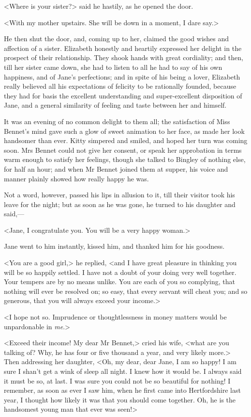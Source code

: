 <Where is your sister?> said he hastily, as he opened the door.

<With my mother upstairs. She will be down in a moment, I dare say.>

He then shut the door, and, coming up to her, claimed the good wishes and affection of a sister. Elizabeth honestly and heartily expressed her delight in the prospect of their relationship. They shook hands with great cordiality; and then, till her sister came down, she had to listen to all he had to say of his own happiness, and of Jane's perfections; and in spite of his being a lover, Elizabeth really believed all his expectations of felicity to be rationally founded, because they had for basis the excellent understanding and super-excellent disposition of Jane, and a general similarity of feeling and taste between her and himself.

It was an evening of no common delight to them all; the satisfaction of Miss Bennet's mind gave such a glow of sweet animation to her face, as made her look handsomer than ever. Kitty simpered and smiled, and hoped her turn was coming soon. Mrs Bennet could not give her consent, or speak her approbation in terms warm enough to satisfy her feelings, though she talked to Bingley of nothing else, for half an hour; and when Mr Bennet joined them at supper, his voice and manner plainly showed how really happy he was.

Not a word, however, passed his lips in allusion to it, till their visitor took his leave for the night; but as soon as he was gone, he turned to his daughter and said,—

<Jane, I congratulate you. You will be a very happy woman.>

Jane went to him instantly, kissed him, and thanked him for his goodness.

<You are a good girl,> he replied, <and I have great pleasure in thinking you will be so happily settled. I have not a doubt of your doing very well together. Your tempers are by no means unlike. You are each of you so complying, that nothing will ever be resolved on; so easy, that every servant will cheat you; and so generous, that you will always exceed your income.>

<I hope not so. Imprudence or thoughtlessness in money matters would be unpardonable in \textit{me}.>

<Exceed their income! My dear Mr Bennet,> cried his wife, <what are you talking of? Why, he has four or five thousand a year, and very likely more.> Then addressing her daughter, <Oh, my dear, dear Jane, I am so happy! I am sure I shan't get a wink of sleep all night. I knew how it would be. I always said it must be so, at last. I was sure you could not be so beautiful for nothing! I remember, as soon as ever I saw him, when he first came into Hertfordshire last year, I thought how likely it was that you should come together. Oh, he is the handsomest young man that ever was seen!>

